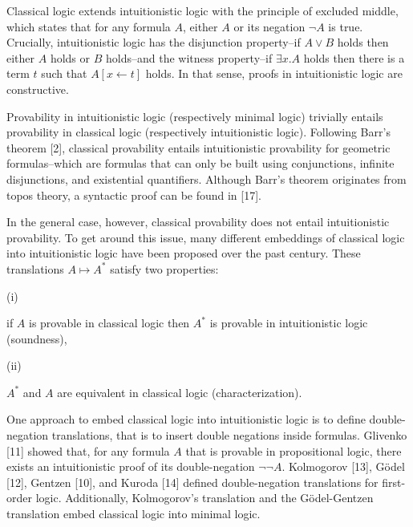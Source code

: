 \documentclass[10pt,a4paper]{article}
\begin{document}
Classical logic extends intuitionistic logic with the principle of excluded middle, which states that for any formula $A$, either $A$ or its negation $\neg A$ is true. Crucially, intuitionistic logic has the disjunction property–if $A\mathbin{\vee}B$ holds then either $A$ holds or $B$ holds–and the witness property–if ${\exists}x.A$ holds then there is a term $t$ such that $A[x\leftarrow t]$ holds. In that sense, proofs in intuitionistic logic are constructive.\par
 
 
 
Provability in intuitionistic logic (respectively minimal logic) trivially entails provability in classical logic (respectively intuitionistic logic). Following Barr’s theorem [2], classical provability entails intuitionistic provability for geometric formulas–which are formulas that can only be built using conjunctions, infinite disjunctions, and existential quantifiers. Although Barr’s theorem originates from topos theory, a syntactic proof can be found in [17].\par
 
 
 
In the general case, however, classical provability does not entail intuitionistic provability. To get around this issue, many different embeddings of classical logic into intuitionistic logic have been proposed over the past century. These translations $A\mapsto A^{*}$ satisfy two properties:\par
  
\par\noindent  (i) 
 
if $A$ is provable in classical logic then $A^{*}$ is provable in intuitionistic logic (soundness),\par
 
 
 
\par\noindent  (ii) 
 
$A^{*}$ and $A$ are equivalent in classical logic (characterization).\par
 
 
  
One approach to embed classical logic into intuitionistic logic is to define double-negation translations, that is to insert double negations inside formulas. Glivenko [11] showed that, for any formula $A$ that is provable in propositional logic, there exists an intuitionistic proof of its double-negation $\neg\neg A$. Kolmogorov [13], Gödel [12], Gentzen [10], and Kuroda [14] defined double-negation translations for first-order logic. Additionally, Kolmogorov’s translation and the Gödel-Gentzen translation embed classical logic into minimal logic.\par
 
\end{document}
